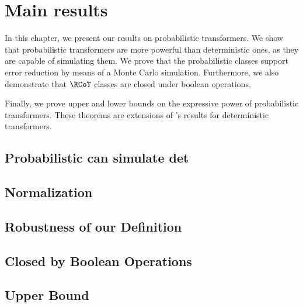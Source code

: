 \chapter{Main results}

In this chapter, we present our results on probabilistic transformers.
We show that probabilistic transformers are more powerful than deterministic ones, as they are capable of simulating them.
We prove that the probabilistic classes support error reduction by means of a Monte Carlo simulation.
Furthermore, we also demonstrate that $\RCoT$ classes are closed under boolean operations.

Finally, we prove upper and lower bounds on the expressive power of probabilistic transformers.
These theorems are extensions of \cite{toyota}'s results for deterministic transformers.



\section{Probabilistic can simulate det}\label{prob-sim-det}



\section{Normalization}



\section{Robustness of our Definition}\label{error-reduction}



\section{Closed by Boolean Operations}\label{prob-bool}



\section{Upper Bound}\label{section-prob-upper-bound}

